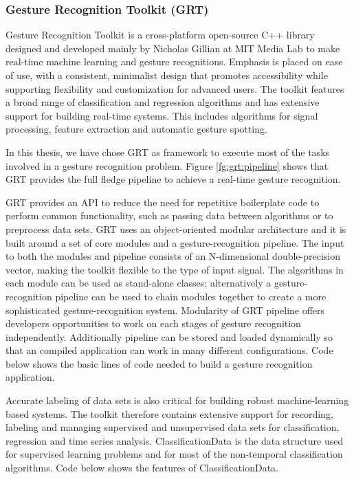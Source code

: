 \subsubsection{Gesture Recognition Toolkit (GRT)} Gesture Recognition Toolkit is a cross-platform open-source C++ library designed and developed mainly by Nicholas Gillian at MIT Media Lab to make real-time machine learning and gesture recognitions. Emphasis is placed on ease of use, with a consistent, minimalist design that promotes accessibility while supporting flexibility and customization for advanced users. The toolkit features a broad range of classification and regression algorithms and has extensive support for building real-time systems. This includes algorithms for signal processing, feature extraction and automatic gesture spotting. 

In this thesis, we have chose GRT as framework to execute most of the tasks involved in a gesture recognition problem. Figure \ref{fg:grt:pipeline} shows that GRT provides the full fledge pipeline to achieve a real-time gesture recognition. 



GRT provides an API to reduce the need for repetitive boilerplate code to perform common functionality, such as passing data between algorithms or to preprocess data sets. GRT uses an object-oriented modular architecture and it is built around a set of core modules and a gesture-recognition pipeline. The input to both the modules and pipeline consists of an N-dimensional double-precision vector, making the toolkit flexible to the type of input signal. The algorithms in each module can be used as stand-alone classes; alternatively a gesture-recognition pipeline can be used to chain modules together to create a more sophisticated gesture-recognition system. Modularity of GRT pipeline offers developers opportunities to work on each stages of gesture recognition independently. Additionally pipeline can be stored and loaded dynamically so that an compiled application can work in many different configurations. Code below shows the basic lines of code needed to build a gesture recognition application.

Accurate labeling of data sets is also critical for building robust machine-learning based systems. The toolkit therefore contains extensive support for recording, labeling and managing supervised and unsupervised data sets for classification, regression and time series analysis. ClassificationData is the data structure used for supervised learning problems and for most of the non-temporal classification algorithms. Code below shows the features of ClassificationData.

